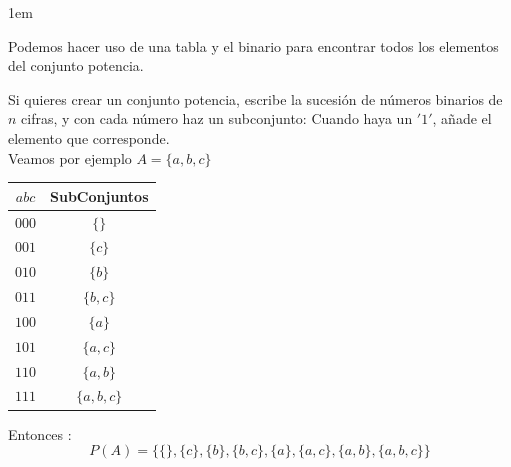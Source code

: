 \documentclass[12pt, fleqn]{report}                             %
\newenvironment{SmallIndentation}[1][0.75em]                    %
        {\begin{adjustwidth}{#1}{}\begin{footnotesize}}             %
        {\end{footnotesize}\end{adjustwidth}}                       %
\theoremstyle{break}                                            %
\begin{document}
                \begin{SmallIndentation}[1em]
                    
                    Podemos hacer uso de una tabla y el binario para encontrar todos los
                    elementos del conjunto potencia.

                    Si quieres crear un conjunto potencia, escribe la sucesión de números binarios de $n$ cifras,
                    y con cada número haz un subconjunto: Cuando haya un $'1'$, añade el elemento que corresponde.\\

                    Veamos por ejemplo $A = \{a, b, c\}$ \\


                    \begin{tabular}{c | c  }
                       $a b c$ & SubConjuntos       \\
                       \midrule
                      
                       $0 0 0$ &  $\{ \}$           \\
                       $0 0 1$ &  $\{ c \}$         \\
                       $0 1 0$ &  $\{ b \}$         \\
                       $0 1 1$ &  $\{ b, c \}$      \\
                       $1 0 0$ &  $\{ a \}$         \\
                       $1 0 1$ &  $\{ a, c \}$      \\
                       $1 1 0$ &  $\{ a, b \}$      \\
                       $1 1 1$ &  $\{ a, b, c \}$   \\
                     
                    \end{tabular}

                    Entonces : 
                    \begin{equation*}
                        P(A) = 
                        \{
                            \{ \}, \{ c \}, \{ b \}, \{ b, c \}, 
                            \{ a \}, \{ a, c \}, \{ a, b \}, \{ a, b, c \}
                        \}
                    \end{equation*}
                
                \end{SmallIndentation}
                
\end{document}
